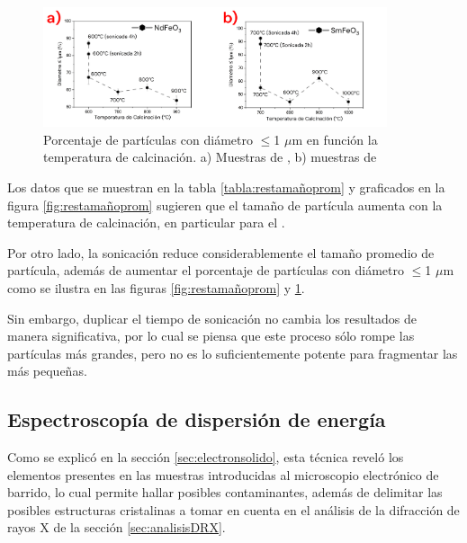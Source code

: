 \documentclass[../main.tex]{subfiles}
\begin{document}
\begin{figure}[H]
    \centering
    \includegraphics[width=0.9\textwidth]{fig/resporcentaje.png}
    \caption{Porcentaje de partículas con diámetro $\leq$1 $\mu$m en función la temperatura de calcinación. a) Muestras de \neod{}, b) muestras de \sama{}}
    \label{fig:resporcentaje}
\end{figure}
Los datos que se muestran en la tabla \ref{tabla:restamañoprom} y graficados en la figura \ref{fig:restamañoprom} sugieren que el tamaño de partícula aumenta con la temperatura de calcinación, en particular para el \neod{}.

Por otro lado, la sonicación reduce considerablemente el tamaño promedio de partícula, además de aumentar el porcentaje de partículas con diámetro $\leq$1 $\mu$m como se ilustra en las figuras \ref{fig:restamañoprom} y \ref{fig:resporcentaje}.

Sin embargo, duplicar el tiempo de sonicación no cambia los resultados de manera significativa, por lo cual se piensa que este proceso sólo rompe las partículas más grandes, pero no es lo suficientemente potente para fragmentar las más pequeñas.
\subsection{Espectroscopía de dispersión de energía}
Como se explicó en la sección \ref{sec:electronsolido}, esta técnica reveló los elementos presentes en las muestras introducidas al microscopio electrónico de barrido, lo cual permite hallar posibles contaminantes, además de delimitar las posibles estructuras cristalinas a tomar en cuenta en el análisis de la difracción de rayos X de la sección \ref{sec:analisisDRX}.
\end{document}
